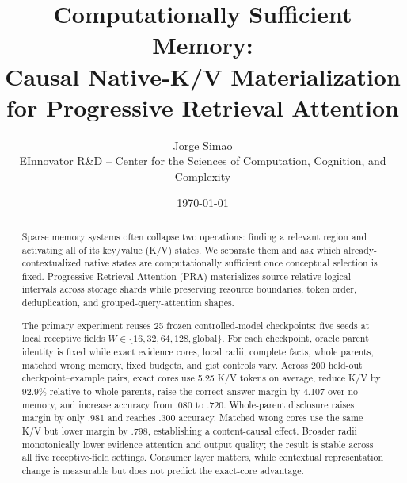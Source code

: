 \documentclass[11pt]{article}
\title{Computationally Sufficient Memory:\\
Causal Native-K/V Materialization for Progressive Retrieval Attention}
\author{Jorge Simao\\EInnovator R\&D -- Center for the Sciences of Computation, Cognition, and Complexity}
\date{\today}
\begin{document}
\maketitle

\begin{abstract}
Sparse memory systems often collapse two operations: finding a relevant region and activating all
of its key/value (K/V) states.  We separate them and ask which already-contextualized native states
are computationally sufficient once conceptual selection is fixed.  Progressive Retrieval
Attention (PRA) materializes source-relative logical intervals across storage shards while
preserving resource boundaries, token order, deduplication, and grouped-query-attention shapes.

The primary experiment reuses 25 frozen controlled-model checkpoints: five seeds at local
receptive fields $W\in\{16,32,64,128,\mathrm{global}\}$.  For each checkpoint, oracle parent
identity is fixed while exact evidence cores, local radii, complete facts, whole parents, matched
wrong memory, fixed budgets, and gist controls vary.  Across 200 held-out checkpoint--example
pairs, exact cores use 5.25 K/V tokens on average, reduce K/V by 92.9\% relative to whole parents,
raise the correct-answer margin by 4.107 over no memory, and increase accuracy from .080 to .720.
Whole-parent disclosure raises margin by only .981 and reaches .300 accuracy.  Matched wrong cores
use the same K/V but lower margin by .798, establishing a content-causal effect.  Broader radii
monotonically lower evidence attention and output quality; the result is stable across all five
receptive-field settings.  Consumer layer matters, while contextual representation change is
measurable but does not predict the exact-core advantage.


\end{abstract}
\end{document}
